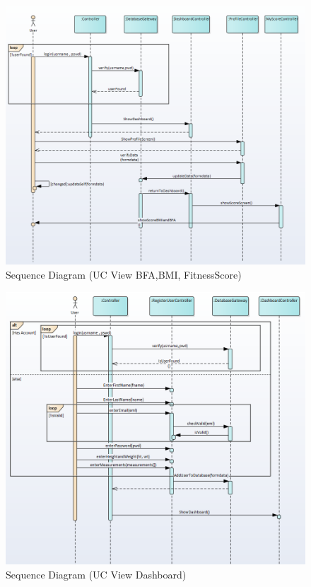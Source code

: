 \documentclass[10pt]{article}
\begin{document}
\begin{figure}[h!]
	\begin{center}
		\includegraphics[width=\columnwidth]{UC1.png}
		\caption{{Sequence Diagram (UC View BFA,BMI, FitnessScore)
				{\label{div-391931}}%
		}}
	\end{center}
\end{figure}


\begin{figure}[h!]
	\begin{center}
		\includegraphics[width=\columnwidth]{UC2.png}
		\caption{{Sequence Diagram (UC View Dashboard)
				{\label{div-475015}}%
		}}
	\end{center}
\end{figure}
\end{document}
